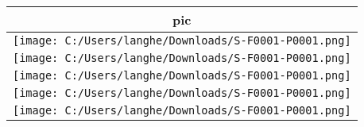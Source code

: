 \documentclass[
]{article}
\begin{document}
\begin{longtable}[]{@{}c@{}}
\toprule
\begin{minipage}[b]{0.69\columnwidth}\centering
pic\strut
\end{minipage}\tabularnewline
\midrule
\endhead
\begin{minipage}[t]{0.69\columnwidth}\centering
\texttt{[image: C:/Users/langhe/Downloads/S-F0001-P0001.png]}\strut
\end{minipage}\tabularnewline
\begin{minipage}[t]{0.69\columnwidth}\centering
\texttt{[image: C:/Users/langhe/Downloads/S-F0001-P0001.png]}\strut
\end{minipage}\tabularnewline
\begin{minipage}[t]{0.69\columnwidth}\centering
\texttt{[image: C:/Users/langhe/Downloads/S-F0001-P0001.png]}\strut
\end{minipage}\tabularnewline
\begin{minipage}[t]{0.69\columnwidth}\centering
\texttt{[image: C:/Users/langhe/Downloads/S-F0001-P0001.png]}\strut
\end{minipage}\tabularnewline
\begin{minipage}[t]{0.69\columnwidth}\centering
\texttt{[image: C:/Users/langhe/Downloads/S-F0001-P0001.png]}\strut
\end{minipage}\tabularnewline
\bottomrule
\end{longtable}
\end{document}
